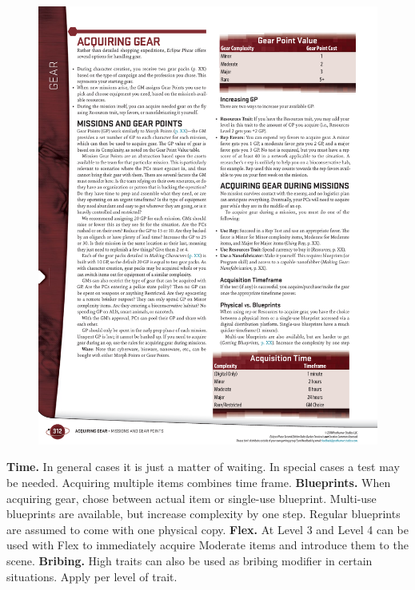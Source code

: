\begin{figure}[htb!]%
   \includegraphics[scale=0.95]{gfx/resources-rep-gearpoints}%
\end{figure}%

\begin{itemize}
    \itembox \textbf{Time.} In general cases it is just a matter of
    waiting. In special cases a  test may be needed. Acquiring multiple items combines time frame.
    \itembox \textbf{Blueprints.} When acquiring gear, chose between actual item or single-use blueprint. Multi-use blueprints are available, but increase complexity by one step. Regular blueprints are assumed to come with one physical copy.
    \itembox \textbf{Flex.} At Level 3 and Level 4 can be used with Flex to immediately
            acquire Moderate items and introduce them to the scene.
    \itembox \textbf{Bribing.} High traits can also be used as bribing modifier in
        certain situations. Apply  per level of trait.
\end{itemize}

